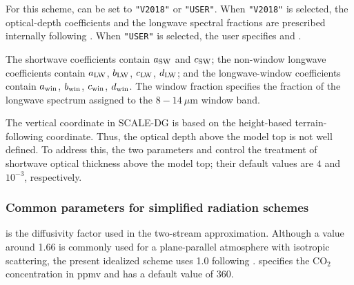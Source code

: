 
For this scheme,  can be set to \verb|"V2018"| or \verb|"USER"|.
When \verb|"V2018"| is selected, the optical-depth coefficients and the longwave spectral fractions are prescribed internally following \cite{Vallis2018}.
When \verb|"USER"| is selected, the user specifies
and . 

The shortwave coefficients contain $a_{\rm SW}$ and $c_{\rm SW}$;
the non-window longwave coefficients contain $a_{\rm LW}$, $b_{\rm LW}$, $c_{\rm LW}$, $d_{\rm LW}$;
and the longwave-window coefficients contain $a_{\rm win}$, $b_{\rm win}$, $c_{\rm win}$, $d_{\rm win}$.
The window fraction specifies the fraction of the longwave spectrum assigned to the $8-14~\mu\mathrm{m}$ window band.

The vertical coordinate in SCALE-DG is based on the height-based terrain-following coordinate.
Thus, the optical depth above the model top is not well defined.
To address this, the two parameters
 and
 control the treatment of shortwave optical thickness above the model top; 
their default values are $4$ and $10^{-3}$, respectively.

\subsubsection{Common parameters for simplified radiation schemes}
 is the diffusivity factor used in the two-stream approximation. Although a value around 1.66 is commonly used for a plane-parallel atmosphere with isotropic scattering, 
the present idealized scheme uses 1.0 following \cite{Vallis2018}.
 specifies the CO$_2$ concentration in ppmv and has a default value of 360.  
